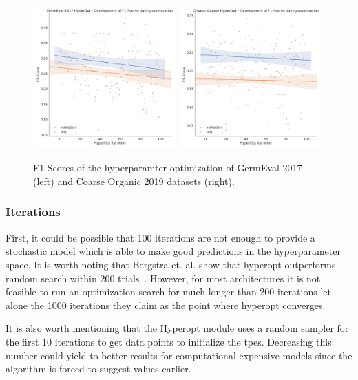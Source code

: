 \begin{figure}[ht]
	\centering
	\includegraphics[width=0.49\textwidth]{figures/06_results/06_hp_ge_lm_f1time}
	\includegraphics[width=0.49\textwidth]{figures/06_results/06_hp_og_lm_f1time}
	\caption{F1 Scores of the hyperparamter optimization of GermEval-2017 {(left)} and Coarse Organic 2019 datasets {(right)}.}
	\label{fig:06_F1GermEvalHp}
\end{figure}

\subsubsection*{Iterations}

First, it could be possible that 100 iterations are not enough to provide a stochastic model which is able to make good predictions in the hyperparameter space. It is worth noting that Bergstra et. al. show that hyperopt outperforms random search within 200 trials~\cite{Bergstra2013}. However, for most architectures it is not feasible to run an optimization search for much longer than 200 iterations let alone the 1000 iterations they claim as the point where hyperopt converges. 
\medskip

It is also worth mentioning that the Hyperopt module uses a random sampler for the first 10 iterations to get data points to initialize the \glspl{tpe}. Decreasing this number could yield to better results for computational expensive models since the algorithm is forced to suggest values earlier.

